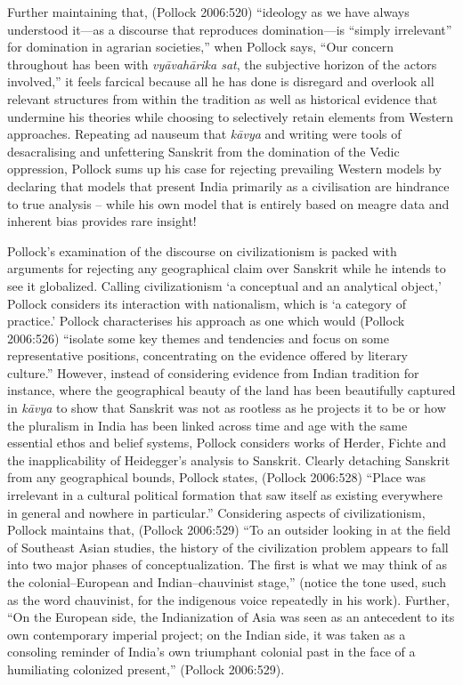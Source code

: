 Further maintaining that, (Pollock 2006:520) “ideology as we have always understood it—as a discourse that reproduces domination—is “simply irrelevant” for domination in agrarian societies,” when Pollock says, “Our concern throughout has been with \textit{vyāvahārika sat}, the subjective horizon of the actors involved,” it feels farcical because all he has done is disregard and overlook all relevant structures from within the tradition as well as historical evidence that undermine his theories while choosing to selectively retain elements from Western approaches. Repeating ad nauseum that \textit{kāvya} and writing were tools of desacralising and unfettering Sanskrit from the domination of the Vedic oppression, Pollock sums up his case for rejecting prevailing Western models by declaring that models that present India primarily as a civilisation are hindrance to true analysis – while his own model that is entirely based on meagre data and inherent bias provides rare insight!

Pollock’s examination of the discourse on civilizationism is packed with arguments for rejecting any geographical claim over Sanskrit while he intends to see it globalized. Calling civilizationism ‘a conceptual and an analytical object,’ Pollock considers its interaction with nationalism, which is ‘a category of practice.’ Pollock characterises his approach as one which would (Pollock 2006:526) “isolate some key themes and tendencies and focus on some representative positions, concentrating on the evidence offered by literary culture.” However, instead of considering evidence from Indian tradition for instance, where the geographical beauty of the land has been beautifully captured in \textit{kāvya} to show that Sanskrit was not as rootless as he projects it to be or how the pluralism in India has been linked across time and age with the same essential ethos and belief systems, Pollock considers works of Herder, Fichte and the inapplicability of Heidegger’s analysis to Sanskrit. Clearly detaching Sanskrit from any geographical bounds, Pollock states, (Pollock 2006:528) “Place was irrelevant in a cultural political formation that saw itself as existing everywhere in general and nowhere in particular.” Considering aspects of civilizationism, Pollock maintains that, (Pollock 2006:529) “To an outsider looking in at the field of Southeast Asian studies, the history of the civilization problem appears to fall into two major phases of conceptualization. The first is what we may think of as the colonial–European and Indian–chauvinist stage,” (notice the tone used, such as the word chauvinist, for the indigenous voice repeatedly in his work). Further, “On the European side, the Indianization of Asia was seen as an antecedent to its own contemporary imperial project; on the Indian side, it was taken as a consoling reminder of India’s own triumphant colonial past in the face of a humiliating colonized present,” (Pollock 2006:529).

